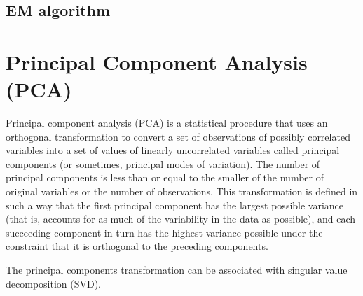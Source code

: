 \subsection{EM algorithm}


\section{Principal Component Analysis (PCA)}

Principal component analysis (PCA) is a statistical procedure that uses an orthogonal transformation to convert a set of observations of possibly correlated variables into a set of values of linearly uncorrelated variables called principal components (or sometimes, principal modes of variation). The number of principal components is less than or equal to the smaller of the number of original variables or the number of observations. This transformation is defined in such a way that the first principal component has the largest possible variance (that is, accounts for as much of the variability in the data as possible), and each succeeding component in turn has the highest variance possible under the constraint that it is orthogonal to the preceding components.

The principal components transformation can be associated with singular value decomposition (SVD).


